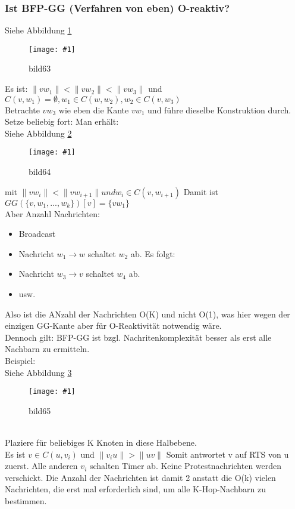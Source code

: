 \documentclass{article}
\newcommand{\bild}[4]{ %
	\begin{figure}[h!]
		\centering
		\texttt{[image: \#1]}
		\caption{#3}
		\label{#4}
	\end{figure}	
}
\newcommand{\sieheBild}[4]{
	Siehe Abbildung \ref{#4}
	\bild{#1}{#2}{#3}{#4}
}
\newcommand{\doubleAbs}[1]{
	\|#1\|
}
\begin{document}
\subsubsection{Ist BFP-GG (Verfahren von eben) O-reaktiv?}
\sieheBild{Bilder/63.png}{0.4}{bild63}{Bild 63}
Es ist: $\doubleAbs{vw_1} < \doubleAbs{vw_2} < \doubleAbs{vw_3}$ und $C(v,w_1) = \emptyset, w_1 \in C(w,w_2), w_2 \in C(v,w_3)$\\
Betrachte $vw_3$ wie eben die Kante $vw_1$ und führe dieselbe Konstruktion durch.\\
Setze beliebig fort: Man erhält: \\
\sieheBild{Bilder/64.png}{0.4}{bild64}{Bild 64}
mit $\doubleAbs{vw_i} < \doubleAbs{vw_{i+1}} und w_i \in C(v, w_{i+1})$
Damit ist $GG(\{v, w_1, ..., w_k\})[v] = \{vw_1\}$\\
Aber Anzahl Nachrichten: 
\begin{itemize}
	\item Broadcast
	\item Nachricht $w_1 \rightarrow w$ schaltet $w_2$ ab. Es folgt:
	\item Nachricht $w_3 \rightarrow v$ schaltet $w_4$ ab. 
	\item usw. 
\end{itemize}
Also ist die ANzahl der Nachrichten O(K) und nicht O(1), was hier wegen der einzigen GG-Kante aber für O-Reaktivität notwendig wäre. \\
Dennoch gilt: BFP-GG ist bzgl. Nachritenkomplexität besser als erst alle Nachbarn zu ermitteln.\\
Beispiel: \\
\sieheBild{Bilder/65.png}{0.4}{bild65}{Bild 65}
\\
Plaziere für beliebiges K Knoten in diese Halbebene.
\\
Es ist $v \in C(u,v_i)$ und $\doubleAbs{v_i u} > \doubleAbs{uv}$
Somit antwortet v auf RTS von u zuerst. Alle anderen $v_i$ schalten Timer ab. Keine Protestnachrichten werden verschickt.
Die Anzahl der Nachrichten ist damit 2 anstatt  die O(k) vielen Nachrichten, die erst mal erforderlich sind, um alle K-Hop-Nachbarn zu bestimmen.
\end{document}
